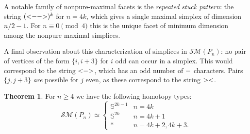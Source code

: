 \documentclass{amsart}
\theoremstyle{definition}
\newtheorem{theorem}{Theorem}[section]
\newcommand{\zs}{{\mathbb S}}
\newcommand{\sm}{{\mathcal{SM}}}
\begin{document}
A notable family of nonpure-maximal facets is the \emph{repeated stuck pattern}: the string $({\tt <}{-}{-}{\tt >})^k$ for $n = 4k$, which gives a single maximal simplex of dimension $n/2-1$. For $n \equiv 0 \pmod{4}$ this is the unique facet of minimum dimension among the nonpure maximal simplices.

A final observation about this characterization of simplices in $\sm(P_n)$: no pair of vertices of the form $\{i,i+3\}$ for $i$ odd can occur in a simplex. This would correspond to the string ${\tt <}{\tt -}{\tt >}$, which has an odd number of ${\tt -}$ characters. Pairs $\{j,j+3\}$ {\em are} possible for $j$ even, as these correspond to the string ${\tt >}{\tt <}$.


\begin{theorem}\label{pathhtyptype}
    For $n\ge 4$ we have the following homotopy types:
    $$\sm(P_n) \simeq \begin{cases}
        \zs^{2k-1} & n=4k \\
        \zs^{2k} & n=4k+1 \\
        \ast & n=4k+2,4k+3.
    \end{cases}$$
\end{theorem}
\end{document}
